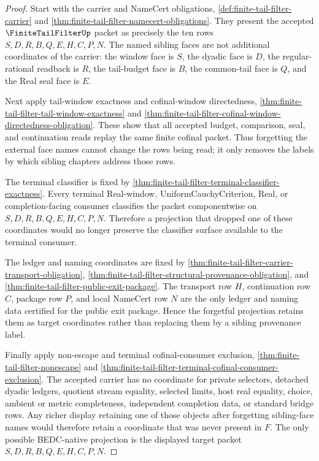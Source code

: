 \begin{proof}
Start with the carrier and NameCert obligations, \autoref{def:finite-tail-filter-carrier} and \autoref{thm:finite-tail-filter-namecert-obligations}. They present the accepted $\FiniteTailFilterUp$ packet as precisely the ten rows $S,D,R,B,Q,E,H,C,P,N$. The named sibling faces are not additional coordinates of the carrier: the window face is $S$, the dyadic face is $D$, the regular-rational readback is $R$, the tail-budget face is $B$, the common-tail face is $Q$, and the Real seal face is $E$.

Next apply tail-window exactness and cofinal-window directedness, \autoref{thm:finite-tail-filter-tail-window-exactness} and \autoref{thm:finite-tail-filter-cofinal-window-directedness-obligation}. These show that all accepted budget, comparison, seal, and continuation reads replay the same finite cofinal packet. Thus forgetting the external face names cannot change the rows being read; it only removes the labels by which sibling chapters address those rows.

The terminal classifier is fixed by \autoref{thm:finite-tail-filter-terminal-classifier-exactness}. Every terminal Real-window, UniformCauchyCriterion, Real, or completion-facing consumer classifies the packet componentwise on $S,D,R,B,Q,E,H,C,P,N$. Therefore a projection that dropped one of these coordinates would no longer preserve the classifier surface available to the terminal consumer.

The ledger and naming coordinates are fixed by \autoref{thm:finite-tail-filter-carrier-transport-obligation}, \autoref{thm:finite-tail-filter-structural-provenance-obligation}, and \autoref{thm:finite-tail-filter-public-exit-package}. The transport row $H$, continuation row $C$, package row $P$, and local NameCert row $N$ are the only ledger and naming data certified for the public exit package. Hence the forgetful projection retains them as target coordinates rather than replacing them by a sibling provenance label.

Finally apply non-escape and terminal cofinal-consumer exclusion, \autoref{thm:finite-tail-filter-nonescape} and \autoref{thm:finite-tail-filter-terminal-cofinal-consumer-exclusion}. The accepted carrier has no coordinate for private selectors, detached dyadic ledgers, quotient stream equality, selected limits, host real equality, choice, ambient or metric completeness, independent completion data, or standard bridge rows. Any richer display retaining one of those objects after forgetting sibling-face names would therefore retain a coordinate that was never present in $F$. The only possible BEDC-native projection is the displayed target packet $S,D,R,B,Q,E,H,C,P,N$.
\end{proof}

